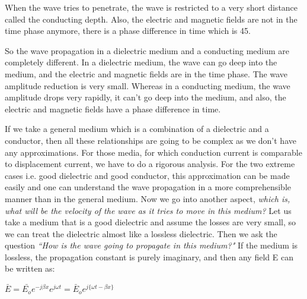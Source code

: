 When the wave tries to penetrate, the wave is restricted to a very short distance called the conducting depth. Also, the electric and magnetic fields are not in the time phase anymore, there is a phase difference in time which is 45\textdegree.

So the wave propagation in a dielectric medium and a conducting medium are completely different. In a dielectric medium, the wave can go deep into the medium, and the electric and magnetic fields are in the time phase. The wave amplitude reduction is very small. Whereas in a conducting medium, the wave amplitude drops very rapidly, it can't go deep into the medium, and also, the electric and magnetic fields have a phase difference in time.

If we take a general medium which is a combination of a dielectric and a conductor, then all these relationships are going to be complex as we don't have any approximations. For those media, for which conduction current is comparable to displacement current, we have to do a rigorous analysis. For the two extreme cases i.e. good dielectric and good conductor, this approximation can be made easily and one can understand the wave propagation in a more comprehensible manner than in the general medium.
Now we go into another aspect, \emph{which is, what will be the velocity of the wave as it tries to move in this medium?} Let us take a medium that is a good dielectric and assume the losses are very small, so we can treat the dielectric almost like a lossless dielectric. Then we ask the question \emph{``How is the wave going to propagate in this medium?"} If the medium is lossless, the propagation constant is purely imaginary, and then any field E can be written as:
\begin{center}
$\bar{E}=\bar{E_{o}}e^{-j\beta x}e^{j\omega t}=\bar{E}_{o}e^{j\{\omega t-\beta x\}} $
\end{center}
\begin{equation}\end{equation}

